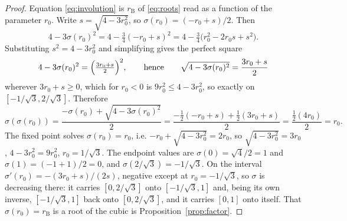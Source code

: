 \documentclass[11pt,a4paper]{article}
\theoremstyle{definition}
\begin{document}
\begin{proof}
Equation \eqref{eq:involution} is $r_{\mathrm{B}}$ of \eqref{eq:roots} read as a function of the parameter $r_{0}$. Write $s=\sqrt{4-3r_{0}^{2}}$, so $\sigma(r_{0})=(-r_{0}+s)/2$. Then
\[
  4-3\sigma(r_{0})^{2}
  =4-\tfrac34(-r_{0}+s)^{2}
  =4-\tfrac34\bigl(r_{0}^{2}-2r_{0}s+s^{2}\bigr).
\]
Substituting $s^{2}=4-3r_{0}^{2}$ and simplifying gives the perfect square
\[
  4-3\sigma(r_{0})^{2}=\Bigl(\tfrac{3r_{0}+s}{2}\Bigr)^{2},
  \qquad\text{hence}\qquad
  \sqrt{4-3\sigma(r_{0})^{2}}=\frac{3r_{0}+s}{2}
\]
wherever $3r_{0}+s\ge0$, which for $r_{0}<0$ is $9r_{0}^{2}\le4-3r_{0}^{2}$, so exactly on $[-1/\sqrt3,2/\sqrt3]$. Therefore
\[
  \sigma(\sigma(r_{0}))
  =\frac{-\sigma(r_{0})+\sqrt{4-3\sigma(r_{0})^{2}}}{2}
  =\frac{-\tfrac12(-r_{0}+s)+\tfrac12(3r_{0}+s)}{2}
  =\frac{\tfrac12(4r_{0})}{2}
  =r_{0}.
\]
The fixed point solves $\sigma(r_{0})=r_{0}$, i.e. $-r_{0}+\sqrt{4-3r_{0}^{2}}=2r_{0}$, so $\sqrt{4-3r_{0}^{2}}=3r_{0}$, $4-3r_{0}^{2}=9r_{0}^{2}$, $r_{0}=1/\sqrt3$. The endpoint values are $\sigma(0)=\sqrt4/2=1$ and $\sigma(1)=(-1+1)/2=0$, and $\sigma(2/\sqrt3)=-1/\sqrt3$. On the interval $\sigma'(r_{0})=-(3r_{0}+s)/(2s)$, negative except at $r_{0}=-1/\sqrt3$, so $\sigma$ is decreasing there: it carries $[0,2/\sqrt3]$ onto $[-1/\sqrt3,1]$ and, being its own inverse, $[-1/\sqrt3,1]$ back onto $[0,2/\sqrt3]$, and it carries $[0,1]$ onto itself. That $\sigma(r_{0})=r_{\mathrm{B}}$ is a root of the cubic is Proposition~\ref{prop:factor}.
\end{proof}
\end{document}
